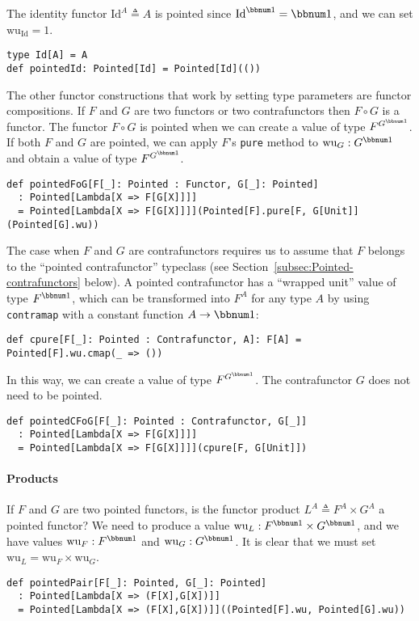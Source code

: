 The identity functor $\text{Id}^{A}\triangleq A$ is pointed since
$\text{Id}^{\bbnum 1}=\bbnum 1$, and we can set $\text{wu}_{\text{Id}}=1$.
\begin{lstlisting}
type Id[A] = A
def pointedId: Pointed[Id] = Pointed[Id](())
\end{lstlisting}

The other functor constructions that work by setting type parameters
are functor compositions. If $F$ and $G$ are two functors or two
contrafunctors then $F\circ G$ is a functor. The functor $F\circ G$
is pointed when we can create a value of type $F^{G^{\bbnum 1}}$.
If both $F$ and $G$ are pointed, we can apply $F$\textsf{'}s \lstinline!pure!
method to $\text{wu}_{G}:G^{\bbnum 1}$ and obtain a value of type
$F^{G^{\bbnum 1}}$.
\begin{lstlisting}
def pointedFoG[F[_]: Pointed : Functor, G[_]: Pointed]
  : Pointed[Lambda[X => F[G[X]]]]
  = Pointed[Lambda[X => F[G[X]]]](Pointed[F].pure[F, G[Unit]](Pointed[G].wu))     
\end{lstlisting}
The case when $F$ and $G$ are contrafunctors requires us to assume
that $F$ belongs to the \textsf{``}pointed contrafunctor\textsf{''} typeclass (see
Section~\ref{subsec:Pointed-contrafunctors} below). A pointed contrafunctor
has a \textsf{``}wrapped unit\textsf{''} value of type $F^{\bbnum 1}$, which can
be transformed into $F^{A}$ for any type $A$ by using \lstinline!contramap!
with a constant function $A\rightarrow\bbnum 1$:
\begin{lstlisting}
def cpure[F[_]: Pointed : Contrafunctor, A]: F[A] = Pointed[F].wu.cmap(_ => ())
\end{lstlisting}
In this way, we can create a value of type $F^{G^{\bbnum 1}}$. The
contrafunctor $G$ does not need to be pointed.
\begin{lstlisting}
def pointedCFoG[F[_]: Pointed : Contrafunctor, G[_]]
  : Pointed[Lambda[X => F[G[X]]]]
  = Pointed[Lambda[X => F[G[X]]]](cpure[F, G[Unit]])
\end{lstlisting}


\paragraph{Products}

If $F$ and $G$ are two pointed functors, is the functor product
$L^{A}\triangleq F^{A}\times G^{A}$ a pointed functor? We need to
produce a value $\text{wu}_{L}:F^{\bbnum 1}\times G^{\bbnum 1}$,
and we have values $\text{wu}_{F}:F^{\bbnum 1}$ and $\text{wu}_{G}:G^{\bbnum 1}$.
It is clear that we must set $\text{wu}_{L}=\text{wu}_{F}\times\text{wu}_{G}$.
\begin{lstlisting}
def pointedPair[F[_]: Pointed, G[_]: Pointed]
  : Pointed[Lambda[X => (F[X],G[X])]]
  = Pointed[Lambda[X => (F[X],G[X])]]((Pointed[F].wu, Pointed[G].wu))
\end{lstlisting}


